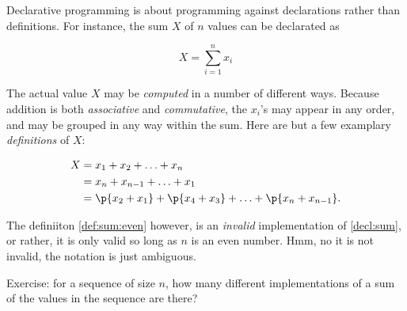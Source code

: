 Declarative programming is about programming against declarations rather than
definitions. For instance, the sum $X$ of $n$ values can be declarated as

\begin{equation}
X=\sum_{i=1}^n x_i\label{decl:sum}
\end{equation}

The actual value $X$ may be \emph{computed} in a number of different ways.
Because addition is both \emph{associative} and \emph{commutative}, the $x_i$'s
may appear in any order, and may be grouped in any way within the sum. Here are
but a few examplary \emph{definitions} of $X$:

\begin{align}
X&=x_1+x_2+\ldots+x_n\\
&=x_n+x_{n-1}+\ldots+x_1\\
&=\p{x_2+x_1}+\p{x_4+x_3}+\ldots+\p{x_n+x_{n-1}}\label{def:sum:even}.
\end{align}

The definiiton \ref{def:sum:even} however, is an \emph{invalid} implementation
of \ref{decl:sum}, or rather, it is only valid so long as $n$ is an even
number. Hmm, no it is not invalid, the notation is just ambiguous.


Exercise: for a sequence of size $n$, how many different implementations of a
sum of the values in the sequence are there?
